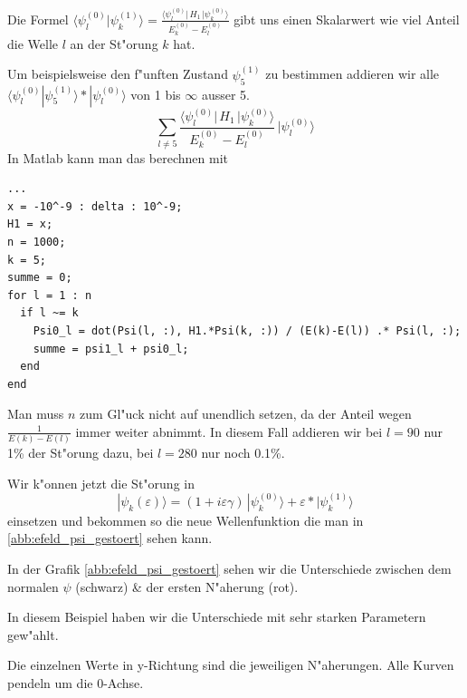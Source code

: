 \begin{refsection}
Die Formel
$\langle\psi_l^{(0)}|\psi_k^{(1)}\rangle
=
\frac{\langle \psi_l^{(0)}|\, H_1 \,|\psi_k^{(0)}\rangle}{E_k^{(0)}-E_l^{(0)}}$
gibt uns einen Skalarwert wie viel Anteil die Welle $l$ an der St"orung $k$ hat.

Um beispielsweise den f"unften Zustand $\psi_5^{(1)}$ zu bestimmen addieren wir alle 
$\langle\psi_l^{(0)}|\psi_5^{(1)}\rangle*|\psi_l^{(0)}\rangle$
 von 1 bis $\infty$ ausser 5.
\begin{equation}
\sum_{l\ne 5}
\frac{\langle \psi_l^{(0)}|\, H_1 \,|\psi_k^{(0)}\rangle}{E_k^{(0)}-E_l^{(0)}}
\,
|\psi_l^{(0)}\rangle
\end{equation}
In Matlab kann man das berechnen mit
\begin{lstlisting}[style=Matlab]
...
x = -10^-9 : delta : 10^-9;
H1 = x;
n = 1000;
k = 5;
summe = 0;
for l = 1 : n
  if l ~= k
    Psi0_l = dot(Psi(l, :), H1.*Psi(k, :)) / (E(k)-E(l)) .* Psi(l, :);
    summe = psi1_l + psi0_l;
  end
end
\end{lstlisting}

Man muss $n$ zum Gl"uck nicht auf unendlich setzen, da der Anteil wegen $\frac{1}{E(k)-E(l)}$ immer weiter abnimmt.
In diesem Fall addieren wir bei $l=90$ nur 1\% der St"orung dazu, bei $l=280$ nur noch 0.1\%.

Wir k"onnen jetzt die St"orung in 
\begin{equation}
|\psi_k(\varepsilon)\rangle
=
(1+i\varepsilon \gamma)
\,|\psi_k^{(0)}\rangle
+
\varepsilon*|\psi_k^{(1)}\rangle
\end{equation}
einsetzen und bekommen so die neue Wellenfunktion die man in \ref{abb:efeld_psi_gestoert} sehen kann.

In der Grafik \ref{abb:efeld_psi_gestoert} sehen wir die Unterschiede zwischen dem normalen $\psi$ (schwarz) \& der ersten N"aherung (rot).

In diesem Beispiel haben wir die Unterschiede mit sehr starken Parametern gew"ahlt.

Die einzelnen Werte in y-Richtung sind die jeweiligen N"aherungen. Alle Kurven pendeln um die 0-Achse.


\end{refsection}
